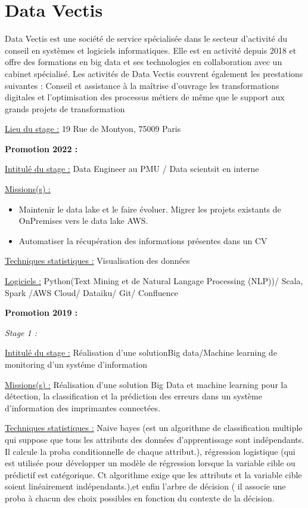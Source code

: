 \documentclass[
  letterpaper,
  DIV=11,
  numbers=noendperiod]{scrreprt}
\begin{document}
\hypertarget{data-vectis}{%
\section{\texorpdfstring{\textbf{Data
Vectis}}{Data Vectis}}\label{data-vectis}}

Data Vectis est une société de service spécialisée dans le secteur
d'activité du conseil en systèmes et logiciels informatiques. Elle est
en activité depuis 2018 et offre des formations en big data et ses
technologies en collaboration avec un cabinet spécialisé. Les activités
de Data Vectis couvrent également les prestations suivantes : Conseil et
assistance à la maîtrise d'ouvrage les transformations digitales et
l'optimisation des processus métiers de même que le support aux grands
projets de transformation

\uline{Lieu du stage :} 19 Rue de Montyon, 75009 Paris

\textbf{Promotion 2022 :}

\uline{Intitulé du stage :} Data Engineer au PMU / Data scientsit en
interne

\uline{Missions(s) :}

\begin{itemize}
\item
  Maintenir le data lake et le faire évoluer. Migrer les projets
  existants de OnPremises vers le data lake AWS.
\item
  Automatiser la récupération des informations présentes dans un CV
\end{itemize}

\uline{Techniques statistiques :} Visualisation des données

\uline{Logiciels :} Python(Text Mining et de Natural Langage Processing
(NLP))/ Scala, Spark /AWS Cloud/ Dataiku/ Git/ Confluence

\textbf{Promotion 2019 :}

\emph{Stage 1 :}

\uline{Intitulé du stage :} Réalisation d'une solutionBig data/Machine
learning de monitoring d'un systéme d'information

\uline{Missions(s) :} Réalisation d'une solution Big Data et machine
learning pour la détection, la classification et la prédiction des
erreurs dans un système d'information des imprimantes connectées.

\uline{Techniques statistiques :} Naive bayes (est un algorithme de
classification multiple qui suppose que tous les attributs des données
d'apprentissage sont indépendants. Il calcule la proba conditionnelle de
chaque attribut.), régression logistique (qui est utilisée pour
développer un modèle de régression lorsque la variable cible ou
prédictif est catégorique. Ct algorithme exige que les attributs et la
variable cible soient linéairement indépendants.),et enfin l'arbre de
décision ( il associe une proba à chacun des choix possibles en fonction
du contexte de la décision.
\end{document}
